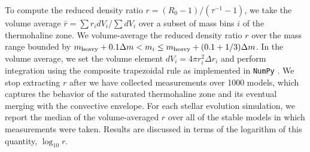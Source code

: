 To compute the reduced density ratio $r = (R_0 - 1)/(\tau^{-1} - 1)$, we take the volume average $\bar{r} = \sum r_i dV_i / \sum dV_i$ over a subset of mass bins $i$ of the thermohaline zone. We volume-average the reduced density ratio $r$ over the mass range bounded by $m_{\rm{heavy}} + 0.1\Delta m  < m_i \leq m_{\rm heavy} + (0.1 + 1/3)\Delta m$.
In the volume average, we set the volume element $dV_i = 4\pi r_i^2 \Delta r_i$ and perform integration using the composite trapezoidal rule as implemented in \texttt{NumPy} \citep{numpy}.
We stop extracting $r$ after we have collected measurements over 1000 models, which captures the behavior of the saturated thermohaline zone and its eventual merging with the convective envelope. For each stellar evolution simulation, we report the median of the volume-averaged $r$ over all of the stable models in which measurements were taken. Results are discussed in terms of the logarithm of this quantity, $\log_{10} r$.